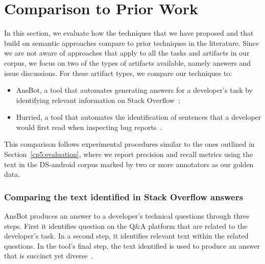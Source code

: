 \section{Comparison to Prior Work}
\label{cp5:comparison}



In this section, we evaluate how the techniques that we have proposed and that build on semantic approaches
compare to prior techniques in the literature. Since we are not aware of approaches that 
apply to all the tasks and artifacts in our corpus, we focus on two of the types of artifacts available, 
namely  answers and  issue discussions.
For these artifact types, we compare our techniques to: 



\begin{itemize}
    \item \acf{AnsBot}, a tool that automates generating answers for a developer's task by identifying relevant information on Stack Overflow~\cite{Xu2017};
    \item \acf{Hurried}, a tool that automates the identification of sentences that a developer would first read when inspecting bug reports~\cite{Lotufo2012}.
\end{itemize}



This comparison follows experimental procedures similar to the ones outlined in Section~\ref{cp5:evaluation},
where we report precision and recall metrics using the text in the \acs{DS-android} corpus marked by two or more annotators
as our golden data.




\subsubsection{Comparing the text identified in Stack Overflow answers}



\acs{AnsBot} produces an answer to a developer's technical questions through three steps. 
First it identifies question on the Q\&A platform that are related to the developer's task. 
In a second step, it identifies relevant text within the related questions. 
In the tool's final step, the text identified is used to produce an answer that is succinct yet diverse~\cite{Xu2017}.



